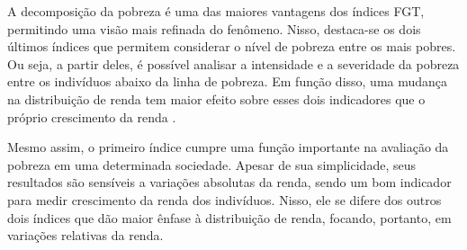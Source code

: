 A decomposição da pobreza é uma das maiores vantagens dos índices FGT, permitindo uma visão mais refinada do fenômeno. Nisso, destaca-se os dois últimos índices que permitem considerar o nível de pobreza entre os mais pobres. Ou seja, a partir deles, é possível analisar a intensidade e a severidade da pobreza entre os indivíduos abaixo da linha de pobreza. Em função disso, uma mudança na distribuição de renda tem maior efeito sobre esses dois indicadores que o próprio crescimento da renda \cite{kraay04}.

Mesmo assim, o primeiro índice cumpre uma função importante na avaliação da pobreza em uma determinada sociedade. Apesar de sua simplicidade, seus resultados são sensíveis a variações absolutas da renda, sendo um bom indicador para medir crescimento da renda dos indivíduos. Nisso, ele se difere dos outros dois índices que dão maior ênfase à distribuição de renda, focando, portanto, em variações relativas da renda.



